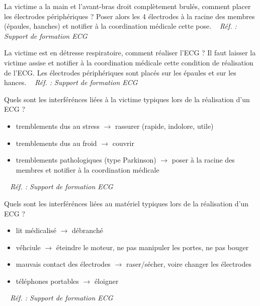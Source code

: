 \documentclass[grid,avery5371,landscape]{flashcards}
\makeatletter
\newcounter{nocarte}
\newcommand{\categ}[1]{%
  \def\@categ{#1}%
  \setcounter{nocarte}{0}%
}
\newcommand{\source}[1]{%
  \medskip
  \itshape%
   ~ \hfill Réf. : #1}
\makeatother
\begin{document}
\color[HTML]{FF6D01}
\categ{PSE+}
\begin{flashcard}[geste]{
 La victime a la main et l'avant-bras droit complètement brulés, comment placer les électrodes périphériques ?   }
  Poser alors les 4 électrodes à la racine des membres (épaules, hanches) et notifier à la coordination médicale cette pose.
  \source{Support de formation ECG}
\end{flashcard}


\color[HTML]{FF6D01}
\categ{PSE+}
\begin{flashcard}[geste]{
 La victime est en détresse respiratoire, comment réaliser l'ECG ?   }
  Il faut laisser la victime assise et notifier à la coordination médicale cette condition de réalisation de l'ECG. Les électrodes périphériques sont placés sur les épaules et sur les hances.
  \source{Support de formation ECG}
\end{flashcard}


\color[HTML]{FF6D01}
\categ{PSE+}
\begin{flashcard}[geste]{
 Quels sont les interférénces liées à la victime typiques lors de la réalisation d'un ECG ?   }
  \begin{itemize}
 \item tremblements dus au stress $\rightarrow$ rassurer (rapide, indolore, utile)
 \item tremblements dus au froid $\rightarrow$ couvrir
 \item tremblements pathologiques (type Parkinson) $\rightarrow$ poser à la racine des membres et notifier à la coordination médicale
 \end{itemize}
  \source{Support de formation ECG}
\end{flashcard}


\color[HTML]{FF6D01}
\categ{PSE+}
\begin{flashcard}[geste]{
 Quels sont les interférénces liées au matériel typiques lors de la réalisation d'un ECG ?   }
  \begin{itemize}
 \item lit médicalisé $\rightarrow$ débranché
 \item véhciule $\rightarrow$ éteindre le moteur, ne pas manipuler les portes, ne pas bouger
 \item mauvais contact des électrodes $\rightarrow$ raser/sécher, voire changer les électrodes
 \item téléphones portables $\rightarrow$ éloigner
 \end{itemize}
  \source{Support de formation ECG}
\end{flashcard}
\end{document}

